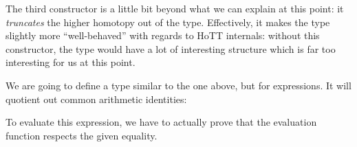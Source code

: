The third constructor is a little bit beyond what we can explain at this point:
it \emph{truncates} the higher homotopy out of the type.
Effectively, it makes the type slightly more ``well-behaved'' with regards to
HoTT internals: without this constructor, the type would have a lot of
interesting structure which is far too interesting for us at this point.

We are going to define a type similar to the one above, but for expressions.
It will quotient out common arithmetic identities:
\begin{agdalisting}
\end{agdalisting}
To evaluate this expression, we have to actually prove that the evaluation
function respects the given equality.


